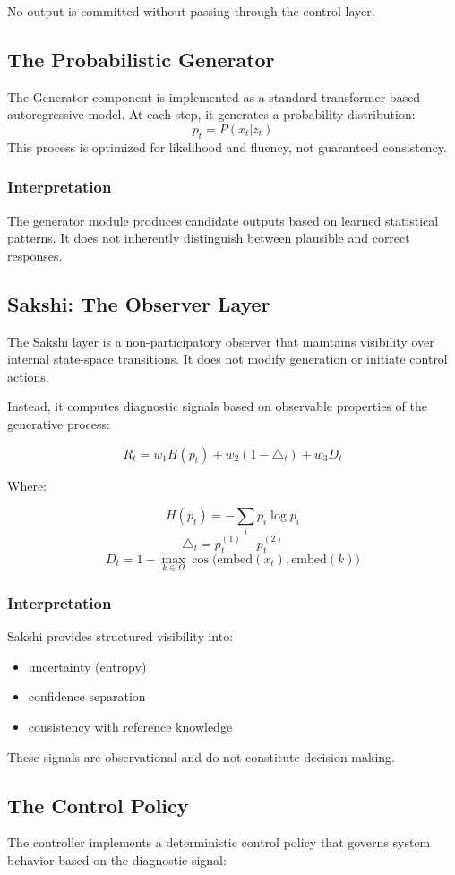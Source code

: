 \documentclass[12pt,a4paper]{article}
\begin{document}
No output is committed without passing through the control layer.

\subsection{The Probabilistic Generator}
The Generator component is implemented as a standard transformer-based autoregressive model. At each step, it generates a probability distribution:
\[
p_t = P(x_t|z_t)
\]
This process is optimized for likelihood and fluency, not guaranteed consistency.

\subsubsection *{Interpretation}
The generator module produces candidate outputs based on learned statistical patterns. It does not inherently distinguish between plausible and correct responses.

\subsection{Sakshi: The Observer Layer}
The Sakshi layer is a non-participatory observer that maintains visibility over internal state-space transitions. It does not modify generation or initiate control actions.

Instead, it computes diagnostic signals based on observable properties of the generative process:

\[
R_t = w_1H(p_t) + w_2(1-\triangle_t) + w_3D_t
\]

Where:

\[
H(p_t) = -\sum_{i} p_i \log p_i
\]
\[
\triangle_t=p_t^{(1)}-p_t^{(2)}
\]
\[
D_t = 1 - \max_{k \in \Omega} \cos\big(\text{embed}(x_t), \text{embed}(k)\big)
\]

\subsubsection *{Interpretation}
Sakshi provides structured visibility into:
\begin{itemize}
    \item uncertainty (entropy)
    \item confidence separation
    \item consistency with reference knowledge
\end{itemize}
These signals are observational and do not constitute decision-making.

\subsection{The Control Policy}
The controller implements a deterministic control policy that governs system behavior based on the diagnostic signal:
\end{document}
